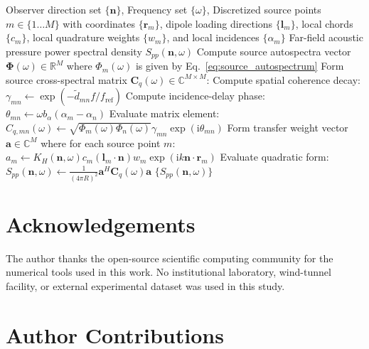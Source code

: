 \documentclass[11pt]{article}
\newcommand{\ii}{\mathrm{i}}
\newcommand{\vect}[1]{\bm{#1}}
\newcommand{\mat}[1]{\bm{#1}}
\begin{document}
\begin{algorithm}[htbp]
\caption{Evaluation of Positive-Semidefinite Array Far-Field Pressure Spectrum}
\label{alg:psd_eval}
\begin{algorithmic}[1]
\Require Observer direction set $\{\vect{n}\}$, Frequency set $\{\omega\}$, Discretized source points $m \in \{1 \dots M\}$ with coordinates $\{\vect{r}_m\}$, dipole loading directions $\{\vect{l}_m\}$, local chords $\{c_m\}$, local quadrature weights $\{w_m\}$, and local incidences $\{\alpha_m\}$
\Ensure Far-field acoustic pressure power spectral density $S_{pp}(\vect{n}, \omega)$
    \State Compute source autospectra vector $\vect{\Phi}(\omega) \in \mathbb{R}^M$ where $\Phi_m(\omega)$ is given by Eq.~\ref{eq:source_autospectrum}
    \State Form source cross-spectral matrix $\mat{C}_q(\omega) \in \mathbb{C}^{M \times M}$:
            \State Compute spatial coherence decay: $\gamma_{mn} \gets \exp\left( -\tilde{d}_{mn} f/f_{\mathrm{ref}} \right)$
            \State Compute incidence-delay phase: $\theta_{mn} \gets \omega b_\alpha (\alpha_m - \alpha_n)$
            \State Evaluate matrix element: $C_{q,mn}(\omega) \gets \sqrt{\Phi_m(\omega) \Phi_n(\omega)} \gamma_{mn} \exp(\ii \theta_{mn})$
        \EndFor
    \EndFor
    \For{each observer direction $\vect{n}$}
        \State Form transfer weight vector $\vect{a} \in \mathbb{C}^M$ where for each source point $m$:
        \State \quad $a_m \gets K_H(\vect{n},\omega) c_m (\vect{l}_m \cdot \vect{n}) w_m \exp(\ii k \vect{n} \cdot \vect{r}_m)$
        \State Evaluate quadratic form: $S_{pp}(\vect{n}, \omega) \gets \frac{1}{(4\pi R)^2} \vect{a}^H \mat{C}_q(\omega) \vect{a}$
    \EndFor
\EndFor
\State \Return $\{S_{pp}(\vect{n}, \omega)\}$
\end{algorithmic}
\end{algorithm}

\section{Acknowledgements}

The author thanks the open-source scientific computing community for the numerical tools used in this work. No institutional laboratory, wind-tunnel facility, or external experimental dataset was used in this study.

\section{Author Contributions}
\end{document}
